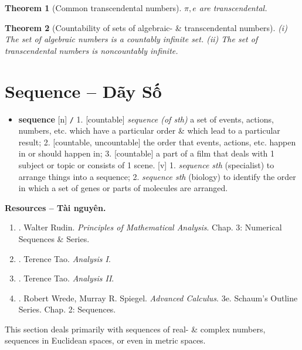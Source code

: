\documentclass[oneside]{book}
\newtheorem{theorem}{Theorem}
\begin{document}
\begin{theorem}[Common transcendental numbers]
	$\pi,e$ are transcendental.
\end{theorem}

\begin{theorem}[Countability of sets of algebraic- \& transcendental numbers]
	(i) The set of algebraic numbers is a countably infinite set. (ii) The set of transcendental numbers is noncountably infinite.
\end{theorem}


\chapter{Sequence -- Dãy Số}
\minitoc
\begin{itemize}\sf\small
	\item \textbf{sequence} [n] {\tt/} 1. [countable] \textit{sequence (of sth)} a set of events, actions, numbers, etc. which have a particular order \& which lead to a particular result; 2. [countable, uncountable] the order that events, actions, etc. happen in or should happen in; 3. [countable] a part of a film that deals with 1 subject or topic or consists of 1 scene. [v] 1. \textit{sequence sth} (specialist) to arrange things into a sequence; 2. \textit{sequence sth} (biology) to identify the order in which a set of genes or parts of molecules are arranged.
\end{itemize}
\textbf{\textsf{Resources -- Tài nguyên.}}
\begin{enumerate}
	\item \cite{Rudin1976}. {\sc Walter Rudin}. {\it Principles of Mathematical Analysis}. Chap. 3: Numerical Sequences \& Series.
	
	\item \cite{Tao_analysis_1}. {\sc Terence Tao}. {\it Analysis I}.
	
	\item \cite{Tao_analysis_2}. {\sc Terence Tao}. {\it Analysis II}.
	
	\item \cite{Wrede_Spiegel2010}. {\sc Robert Wrede, Murray R. Spiegel}. {\it Advanced Calculus}. 3e. Schaum's Outline Series. Chap. 2: Sequences.
\end{enumerate}
This section deals primarily with sequences of real- \& complex numbers, sequences in Euclidean spaces, or even in metric spaces.
\end{document}
